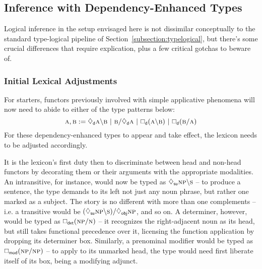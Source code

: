 \subsection{Inference with Dependency-Enhanced Types}
Logical inference in the setup envisaged here is not dissimilar conceptually to the standard type-logical pipeline of Section~\ref{subsection:typelogical}, but there's some crucial differences that require explication, plus a few critical gotchas to beware of.

\subsubsection{Initial Lexical Adjustments}
For starters, functors previously involved with simple applicative phenomena will now need to abide to either of the type patterns below:
\begin{equation}\label{equation:dependency_functors}
	\prop{a}, \prop{b} := \ddia{d}\prop{a} \divleft \prop{b} \ | \ \prop{b}\divright \ddia{d}\prop{a} \ | \  \dbox{d}(\prop{a}\divleft\prop{b}) \ | \ \dbox{d}(\prop{b} \divright \prop{a}) 
\end{equation}
For these dependency-enhanced types to appear and take effect, the lexicon needs to be adjusted accordingly.

It is the lexicon's first duty then to discriminate between head and non-head functors by decorating them or their arguments with the appropriate modalities.
An intransitive, for instance, would now be typed as $\ddia{su}\np[s]\divleft\s[s]$ -- to produce a sentence, the type demands to its left not just any noun phrase, but rather one marked as a subject.
The story is no different with more than one complements -- i.e. a transitive would be $(\ddia{su}\np[s]\divleft\s[s])\divright\ddia{obj}\np[s]$, and so on.
A determiner, however, would be typed as $\dbox{det}(\np[s]\divright\n[s])$ -- it recognizes the right-adjacent noun as its head, but still takes functional precedence over it, licensing the function application by dropping its determiner box.
Similarly, a prenominal modifier would be typed as $\dbox{mod}(\np[s]\divright\np[s])$ -- to apply to its unmarked head, the type would need first liberate itself of its box, being a modifying adjunct.

